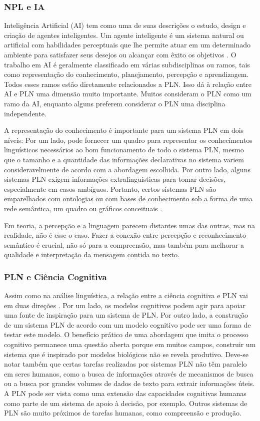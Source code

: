 \documentclass[
	12pt,				%
	openright,			%
	oneside,			%
	a4paper,			%
	english,			%
	spanish,			%
	brazil				%
	]{abntex2}
\begin{document}
	\subsubsection*{NPL e IA}
	Inteligência Artificial (AI) tem como uma de suas descrições o estudo, design e criação de agentes inteligentes. Um agente inteligente é um sistema natural ou artificial com habilidades perceptuais que lhe permite atuar em um determinado ambiente para satisfazer seus desejos ou alcançar com êxito os objetivos \cite{norvig}. O trabalho em AI é geralmente classificado em várias subdisciplinas ou ramos, tais como representação do conhecimento, planejamento, percepção e aprendizagem. Todos esses ramos estão diretamente relacionados a PLN. Isso dá à relação entre AI e PLN uma dimensão muito importante. Muitos consideram o PLN como um ramo da AI, enquanto alguns preferem considerar o PLN uma disciplina independente. 

	
A representação do conhecimento é importante para um sistema PLN em dois níveis: Por um lado, pode fornecer um quadro para representar os conhecimentos linguísticos necessários ao bom funcionamento de todo o sistema PLN, mesmo que o tamanho e a quantidade das informações declarativas no sistema variem consideravelmente de acordo com a abordagem escolhida. Por outro lado, alguns sistemas PLN exigem informações extralinguísticas para tomar decisões, especialmente em casos ambíguos. Portanto, certos sistemas PLN são emparelhados com ontologias ou com bases de conhecimento sob a forma de uma rede semântica, um quadro ou gráficos conceituais \cite{book_natural_lang}.

Em teoria, a percepção e a linguagem parecem distantes umas das outras, mas na realidade, não é esse o caso. Fazer a conexão entre percepção e reconhecimento semântico é crucial, não só para a compreensão, mas também para melhorar a qualidade e interpretação da mensagem contida no texto. 

	\subsubsection*{PLN e Ciência Cognitiva}
	Assim como na análise linguística, a relação entre a ciência cognitiva e PLN vai em duas direções \cite{book_natural_lang}. Por um lado, os modelos cognitivos podem agir para apoiar uma fonte de inspiração para um sistema de PLN. Por outro lado, a construção de um sistema PLN de acordo com um modelo cognitivo pode ser uma forma de testar este modelo. O benefício prático de uma abordagem que imita o processo cognitivo permanece uma questão aberta porque em muitos campos, construir um sistema que é inspirado por modelos biológicos não se revela produtivo. Deve-se notar também que certas tarefas realizadas por sistemas PLN não têm paralelo em seres humanos, como a busca de informações através de mecanismos de busca ou a busca por grandes volumes de dados de texto para extrair informações úteis. A PLN pode ser vista como uma extensão das capacidades cognitivas humanas como parte de um sistema de apoio à decisão, por exemplo. Outros sistemas de PLN são muito próximos de tarefas humanas, como compreensão e produção.
	
\end{document}
